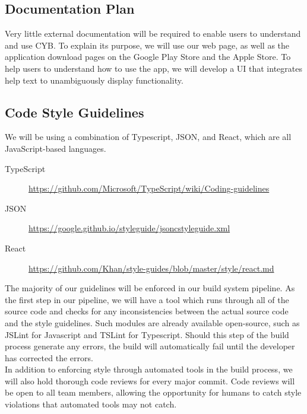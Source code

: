 \documentclass[11pt]{article}
\begin{document}
\subsection{Documentation Plan}

Very little external documentation will be required to enable users to understand and use CYB. To explain its purpose, we will use our web page, as well as the application download pages on the Google Play Store and the Apple Store. To help users to understand how to use the app, we will develop a UI that integrates help text to unambiguously display functionality.

\subsection{Code Style Guidelines}

We will be using a combination of Typescript, JSON, and React, which are all JavaScript-based languages.

\begin{description}
    \item[TypeScript] \href{https://github.com/Microsoft/TypeScript/wiki/Coding-guidelines}{https://github.com/Microsoft/TypeScript/wiki/Coding-guidelines}
    \item[JSON] \href{https://google.github.io/styleguide/jsoncstyleguide.xml}{https://google.github.io/styleguide/jsoncstyleguide.xml}
    \item[React] \href{https://github.com/Khan/style-guides/blob/master/style/react.md}{https://github.com/Khan/style-guides/blob/master/style/react.md}
\end{description}

The majority of our guidelines will be enforced in our build system pipeline. As the first step in our pipeline, we will have a tool which runs through all of the source code and checks for any inconsistencies between the actual source code and the style guidelines. Such modules are already available open-source, such as JSLint for Javascript and TSLint for Typescript. Should this step of the build process generate any errors, the build will automatically fail until the developer has corrected the errors.\\

In addition to enforcing style through automated tools in the build process, we will also hold thorough code reviews for every major commit. Code reviews will be open to all team members, allowing the opportunity for humans to catch style violations that automated tools may not catch.
\end{document}

